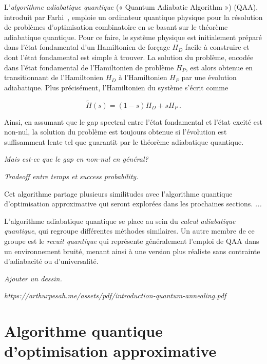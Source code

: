 L'\textit{algorithme adiabatique quantique} (« Quantum Adiabatic Algorithm ») (QAA), introduit par Farhi~\cite{farhiQuantumComputationAdiabatic2000}, emploie un ordinateur quantique physique pour la résolution de problèmes d'optimisation combinatoire en se basant sur le théorème adiabatique quantique. Pour ce faire, le système physique est initialement préparé dans l'état fondamental d'un Hamiltonien de forçage $H_{D}$ facile à construire et dont l'état fondamental est simple à trouver. La solution du problème, encodée dans l'état fondamental de l'Hamiltonien de problème $H_{P}$, est alors obtenue en transitionnant de l'Hamiltonien $H_{D}$ à l'Hamiltonien $H_{P}$ par une évolution adiabatique. Plus précisément, l'Hamiltonien du système s'écrit comme


\begin{equation}
    \tilde{H}(s) = \left(1-s\right) H_{D} + s H_{P} \,.
\end{equation}

Ainsi, en assumant que le gap spectral entre l'état fondamental et l'état excité est non-nul, la solution du problème est toujours obtenue si l'évolution est suffisamment lente tel que guarantit par le théorème adiabatique quantique.

\textcolor{mydarkred}{\textit{Mais est-ce que le gap en non-nul en général?}}

\textcolor{mydarkred}{\textit{Tradeoff entre temps et success probability.}}

Cet algorithme partage plusieurs similitudes avec l'algorithme quantique d'optimisation approximative qui seront explorées dans les prochaines sections. \textcolor{mydarkred}{\textit{...}}


L'algorithme adiabatique quantique se place au sein du \textit{calcul adiabatique quantique}, qui regroupe différentes méthodes similaires. Un autre membre de ce groupe est le \textit{recuit quantique} qui représente généralement l'emploi de QAA dans un environnement bruité, menant ainsi à une version plus réaliste sans contrainte d'adiabacité ou d'universalité. 

\textcolor{mydarkred}{\textit{Ajouter un dessin.}}

\textcolor{mydarkred}{\textit{https://arthurpesah.me/assets/pdf/introduction-quantum-annealing.pdf}}


\section{Algorithme quantique d'optimisation approximative}

